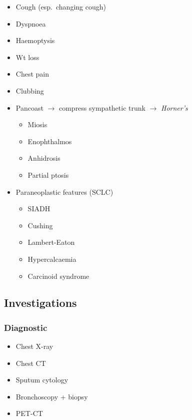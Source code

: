\documentclass[
  12pt,
]{memoir}
\providecommand{\tightlist}{%
  \setlength{\itemsep}{0pt}\setlength{\parskip}{0pt}}
\begin{document}
\begin{itemize}
\tightlist
\item
  Cough (esp.~changing cough)
\item
  Dyspnoea
\item
  Haemoptysis
\item
  Wt loss
\item
  Chest pain
\item
  Clubbing
\item
  Pancoast \(\rightarrow\) compress sympathetic trunk \(\rightarrow\)
  \emph{Horner's}

  \begin{itemize}
  \tightlist
  \item
    Miosis
  \item
    Enophthalmos
  \item
    Anhidrosis
  \item
    Partial ptosis
  \end{itemize}
\item
  Paraneoplastic features (SCLC)

  \begin{itemize}
  \tightlist
  \item
    SIADH
  \item
    Cushing
  \item
    Lambert-Eaton
  \item
    Hypercalcaemia
  \item
    Carcinoid syndrome
  \end{itemize}
\end{itemize}

\hypertarget{investigations}{%
\subsection{Investigations}\label{investigations}}

\hypertarget{diagnostic}{%
\subsubsection{Diagnostic}\label{diagnostic}}

\begin{itemize}
\tightlist
\item
  Chest X-ray
\item
  Chest CT
\item
  Sputum cytology
\item
  Bronchoscopy + biopsy
\item
  PET-CT
\end{itemize}
\end{document}
